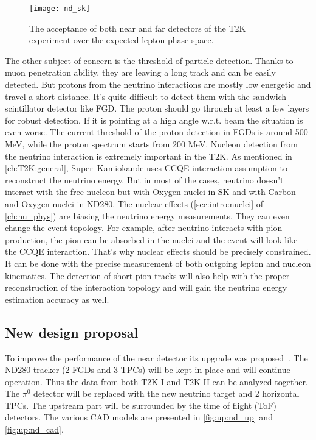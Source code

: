 \documentclass[main.tex]{subfiles}
\begin{document}
\begin{figure}[!ht]
  \centering
  \texttt{[image: nd\_sk]}
  \caption{The acceptance of both near and far detectors of the T2K experiment over the expected lepton phase space.}
  \label{fig:up:ps}
\end{figure}


The other subject of concern is the threshold of particle detection. Thanks to muon penetration ability, they are leaving a long track and can be easily detected. But protons from the neutrino interactions are mostly low energetic and travel a short distance. It's quite difficult to detect them with the sandwich scintillator detector like FGD. The proton should go through at least a few layers for robust detection. If it is pointing at a high angle w.r.t. beam the situation is even worse. The current threshold of the proton detection in FGDs is around 500 MeV, while the proton spectrum starts from 200 MeV. Nucleon detection from the neutrino interaction is extremely important in the T2K. As mentioned in \autoref{ch:T2K:general}, Super--Kamiokande uses CCQE interaction assumption to reconstruct the neutrino energy. But in most of the cases, neutrino doesn't interact with the free nucleon but with Oxygen nuclei in SK and with Carbon and Oxygen nuclei in ND280. The nuclear effects (\autoref{sec:intro:nuclei} of \autoref{ch:nu_phys}) are biasing the neutrino energy measurements. They can even change the event topology. For example, after neutrino interacts with pion production, the pion can be absorbed in the nuclei and the event will look like the CCQE interaction. That's why nuclear effects should be precisely constrained. It can be done with the precise measurement of both outgoing lepton and nucleon kinematics. The detection of short pion tracks will also help with the proper reconstruction of the interaction topology and will gain the neutrino energy estimation accuracy as well.

\subsection{New design proposal}

To improve the performance of the near detector its upgrade was proposed~\cite{Abe2019}. The ND280 tracker (2 FGDs and 3 TPCs) will be kept in place and will continue operation. Thus the data from both T2K-I and T2K-II can be analyzed together. The $\pi^0$ detector will be replaced with the new neutrino target and 2 horizontal TPCs. The upstream part will be surrounded by the time of flight (ToF) detectors. The various CAD models are presented in \autoref{fig:up:nd_up} and \autoref{fig:up:nd_cad}.
\end{document}
